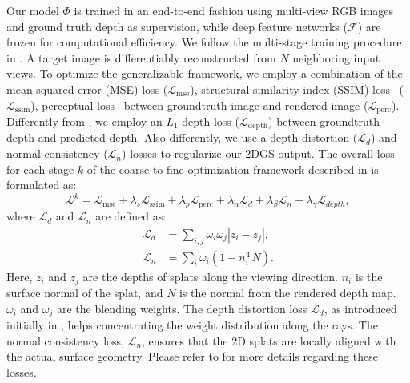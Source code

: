 Our model $\Phi$ is trained in an end-to-end fashion using multi-view RGB images and ground truth depth as supervision, while deep feature networks ($\mathcal{F}$) are frozen for computational efficiency. We follow the multi-stage training procedure in \cite{liu2024fast}. A target image is differentiably reconstructed from $N$ neighboring input views. To optimize the generalizable framework, we employ a combination of the mean squared error (MSE) loss ($\mathcal{L}_{\mathrm{mse}}$), structural similarity index (SSIM) loss~\cite{ssim} ($\mathcal{L}_{\mathrm{ssim}}$), perceptual loss~\cite{lpips} between groundtruth image and rendered image ($\mathcal{L}_{\mathrm{perc}}$). Differently from \cite{liu2024fast}, we employ an $L_1$ depth loss ($\mathcal{L}_{\mathrm{depth}}$) between groundtruth depth and predicted depth. Also differently, we use a depth distortion ($\mathcal{L}_{d}$) and normal consistency ($\mathcal{L}_{n}$) losses to regularize our 2DGS output. The overall loss for each stage $k$ of the coarse-to-fine optimization framework described in \cite{liu2024fast} is formulated as:
\begin{equation}
\mathcal{L}^{k} = \mathcal{L}_{\mathrm{mse}} + \lambda_s \mathcal{L}_{\mathrm{ssim}} + \lambda_p \mathcal{L}_{\mathrm{perc}} + \lambda_\alpha \mathcal{L}_{d} + \lambda_\beta \mathcal{L}_{n} + \lambda_\gamma \mathcal{L}_{depth},
\label{eq:loss}
\end{equation}
where $\mathcal{L}_{d}$ and $\mathcal{L}_{n}$ are defined as:
\begin{equation}
\begin{split}
\mathcal{L}_{d} &= \sum_{i,j} \omega_i \omega_j |z_i - z_j|,\\
\mathcal{L}_{n} &= \sum_{i} \omega_i (1 - n_i^\mathrm{T} N).
\end{split}
\end{equation}
Here, $z_i$ and $z_j$ are the depths of splats along the viewing direction. $n_i$ is the surface normal of the splat, and $N$ is the normal from the rendered depth map. $\omega_i$ and $\omega_j$ are the blending weights. 
The depth distortion loss $\mathcal{L}_{d}$, as introduced initially in \cite{barron2021mip}, helps concentrating the weight distribution along the rays. The normal consistency loss, $\mathcal{L}_{n}$, ensures that the 2D splats are locally aligned with the actual surface geometry. Please refer to \cite{huang20242d} for more details regarding these losses.

